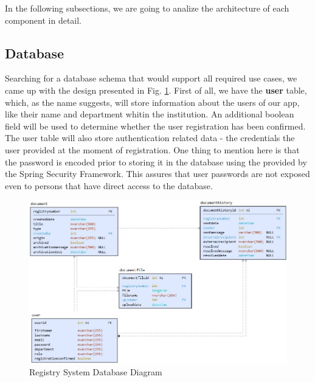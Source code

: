 In the following subsections, we are going to analize the architecture of each component in detail.



\subsection{Database}
\label{subsection:dbLayer}

Searching for a database schema that would support all required use cases, we came up with the design presented in Fig. \ref{db}. First of all, we have the \textbf{user} table, which, as the name suggests, will store information about the users of our app, like their name and department whitin the institution. An additional boolean field will be used to determine whether the user registration has been confirmed. The user table will also store authentication related data - the credentials the user provided at the moment of registration. One thing to mention here is that the password is encoded prior to storing it in the database using the  provided by the Spring Security Framework. This assures that user passwords are not exposed even to persons that have direct access to the database.

\begin{figure}[H]
    \centering
    \includegraphics[width=6in]{images/db}
    \caption{Registry System Database Diagram}
    \label{db}
\end{figure}

